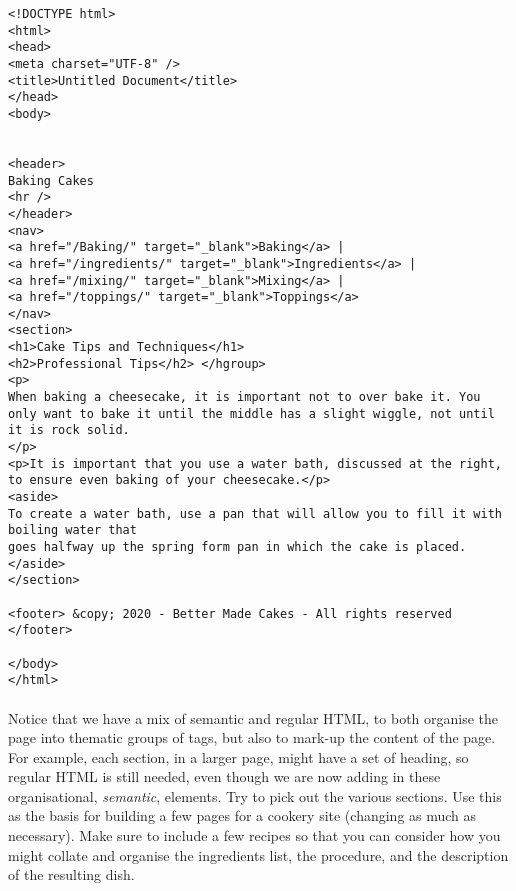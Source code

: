 \documentclass[10pt, a4paper]{article}
\begin{document}
\begin{lstlisting}
<!DOCTYPE html>
<html> 
<head>
<meta charset="UTF-8" />
<title>Untitled Document</title> 
</head>
<body>


<header>
Baking Cakes
<hr />
</header>
<nav>
<a href="/Baking/" target="_blank">Baking</a> |
<a href="/ingredients/" target="_blank">Ingredients</a> | 
<a href="/mixing/" target="_blank">Mixing</a> |
<a href="/toppings/" target="_blank">Toppings</a>
</nav>
<section>
<h1>Cake Tips and Techniques</h1>
<h2>Professional Tips</h2> </hgroup>
<p>
When baking a cheesecake, it is important not to over bake it. You only want to bake it until the middle has a slight wiggle, not until it is rock solid.
</p>
<p>It is important that you use a water bath, discussed at the right, to ensure even baking of your cheesecake.</p>
<aside>
To create a water bath, use a pan that will allow you to fill it with boiling water that
goes halfway up the spring form pan in which the cake is placed.
</aside>
</section>

<footer> &copy; 2020 - Better Made Cakes - All rights reserved </footer>

</body>
</html>
\end{lstlisting}

\paragraph{} Notice that we have a mix of semantic and regular HTML, to both organise the page into thematic groups of tags, but also to mark-up the content of the page. For example, each section, in a larger page, might have a set of heading, so regular HTML is still needed, even though we are now adding in these organisational, \emph{semantic}, elements. Try to pick out the various sections. Use this as the basis for building a few pages for a cookery site (changing as much as necessary). Make sure to include a few recipes so that you can consider how you might collate and organise the ingredients list, the procedure, and the description of the resulting dish.
\end{document}
